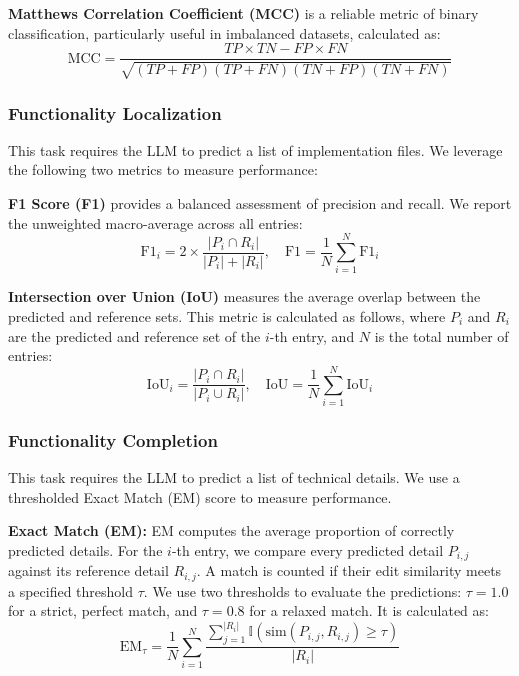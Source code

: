 \textbf{Matthews Correlation Coefficient (MCC)} is a reliable metric of binary classification, particularly useful in imbalanced datasets, calculated as:
\begin{equation}
    \text{MCC} = \frac{TP \times TN - FP \times FN}{\sqrt{(TP+FP)(TP+FN)(TN+FP)(TN+FN)}}
\end{equation}

\subsubsection{Functionality Localization}
This task requires the LLM to predict a list of implementation files. We leverage the following two metrics to measure performance:

\textbf{F1 Score (F1)} provides a balanced assessment of precision and recall. We report the unweighted macro-average across all entries:
\begin{equation}
    \text{F1}_i = 2 \times \frac{|P_i \cap R_i|}{|P_i| + |R_i|}, \quad
        \text{F1} = \frac{1}{N} \sum_{i=1}^{N} \text{F1}_i
\end{equation}

\textbf{Intersection over Union (IoU)} measures the average overlap between the predicted and reference sets. This metric is calculated as follows, where $P_i$ and $R_i$ are the predicted and reference set of the $i$-th entry, and $N$ is the total number of entries:
\begin{equation}
    \text{IoU}_i = \frac{|P_i \cap R_i|}{|P_i \cup R_i|}, \quad
    \text{IoU} = \frac{1}{N} \sum_{i=1}^{N} \text{IoU}_i
\end{equation}

\subsubsection{Functionality Completion}
This task requires the LLM to predict a list of technical details. We use a thresholded Exact Match (EM) score to measure performance.

\textbf{Exact Match (EM):} 
EM computes the average proportion of correctly predicted details. For the $i$-th entry, we compare every predicted detail $P_{i,j}$ against its reference detail $R_{i,j}$. A match is counted if their edit similarity meets a specified threshold $\tau$. We use two thresholds to evaluate the predictions: $\tau=1.0$ for a strict, perfect match, and $\tau=0.8$ for a relaxed match. It is calculated as:
\begin{equation}
    \text{EM}_\tau = \frac{1}{N} \sum_{i=1}^{N} \frac{\sum_{j=1}^{|R_i|} \mathbb{I}(\text{sim}(P_{i,j}, R_{i,j}) \ge \tau)}{|R_i|}
\end{equation}

